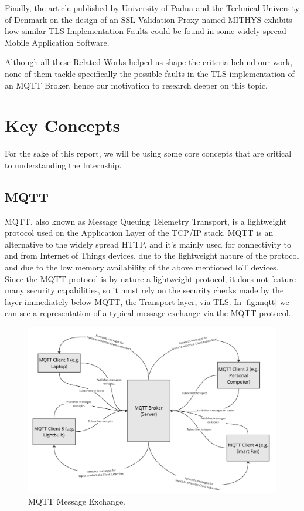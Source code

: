 \documentclass[binding=0.6cm,noexaminfo]{sapthesis}
\begin{document}
Finally, the article published by University of Padua and the Technical University of Denmark on the design of an SSL Validation Proxy named MITHYS \cite{mithys} exhibits how similar TLS Implementation Faults could be found in some widely spread Mobile Application Software.

Although all these Related Works helped us shape the criteria behind our work, none of them tackle specifically the possible faults in the TLS implementation of an MQTT Broker, hence our motivation to research deeper on this topic.

\section{Key Concepts}
For the sake of this report, we will be using some core concepts that are critical to understanding the Internship.

\subsection{MQTT}
MQTT, also known as Message Queuing Telemetry Transport, is a lightweight protocol used on the Application Layer of the TCP/IP stack. MQTT is an alternative to the widely spread HTTP, and it’s mainly used for connectivity to and from Internet of Things devices, due to the lightweight nature of the protocol and due to the low memory availability of the above mentioned IoT devices.
Since the MQTT protocol is by nature a lightweight protocol, it does not feature many security capabilities, so it must rely on the security checks made by the layer immediately below MQTT, the Transport layer, via TLS.
In \autoref{fig:mqtt} we can see a representation of a typical message exchange via the MQTT protocol.

\begin{figure}[htb]
	\includegraphics[width=14cm]{MQTT}
	\caption{MQTT Message Exchange.}
	\label{fig:mqtt}
\end{figure}
\end{document}
